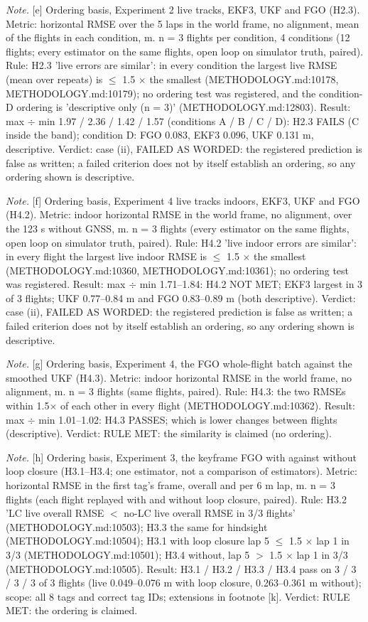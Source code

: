 \begin{table}[htbp]
\textit{Note.} [e] Ordering basis, Experiment 2 live tracks, EKF3, UKF and FGO (H2.3). Metric: horizontal RMSE over the 5 laps in the world frame, no alignment, mean of the flights in each condition, m. n = 3 flights per condition, 4 conditions (12 flights; every estimator on the same flights, open loop on simulator truth, paired). Rule: H2.3 'live errors are similar': in every condition the largest live RMSE (mean over repeats) is $\le$ 1.5 $\times$ the smallest (METHODOLOGY.md:10178, METHODOLOGY.md:10179); no ordering test was registered, and the condition-D ordering is 'descriptive only (n = 3)' (METHODOLOGY.md:12803). Result: max $\div$ min 1.97 / 2.36 / 1.42 / 1.57 (conditions A / B / C / D): H2.3 FAILS (C inside the band); condition D: FGO 0.083, EKF3 0.096, UKF 0.131 m, descriptive. Verdict: case (ii), FAILED AS WORDED: the registered prediction is false as written; a failed criterion does not by itself establish an ordering, so any ordering shown is descriptive.\par
\textit{Note.} [f] Ordering basis, Experiment 4 live tracks indoors, EKF3, UKF and FGO (H4.2). Metric: indoor horizontal RMSE in the world frame, no alignment, over the 123 s without GNSS, m. n = 3 flights (every estimator on the same flights, open loop on simulator truth, paired). Rule: H4.2 'live indoor errors are similar': in every flight the largest live indoor RMSE is $\le$ 1.5 $\times$ the smallest (METHODOLOGY.md:10360, METHODOLOGY.md:10361); no ordering test was registered. Result: max $\div$ min 1.71--1.84: H4.2 NOT MET; EKF3 largest in 3 of 3 flights; UKF 0.77--0.84 m and FGO 0.83--0.89 m (both descriptive). Verdict: case (ii), FAILED AS WORDED: the registered prediction is false as written; a failed criterion does not by itself establish an ordering, so any ordering shown is descriptive.\par
\textit{Note.} [g] Ordering basis, Experiment 4, the FGO whole-flight batch against the smoothed UKF (H4.3). Metric: indoor horizontal RMSE in the world frame, no alignment, m. n = 3 flights (same flights, paired). Rule: H4.3: the two RMSEs within 1.5$\times$ of each other in every flight (METHODOLOGY.md:10362). Result: max $\div$ min 1.01--1.02: H4.3 PASSES; which is lower changes between flights (descriptive). Verdict: RULE MET: the similarity is claimed (no ordering).\par
\textit{Note.} [h] Ordering basis, Experiment 3, the keyframe FGO with against without loop closure (H3.1--H3.4; one estimator, not a comparison of estimators). Metric: horizontal RMSE in the first tag's frame, overall and per 6 m lap, m. n = 3 flights (each flight replayed with and without loop closure, paired). Rule: H3.2 'LC live overall RMSE $<$ no-LC live overall RMSE in 3/3 flights' (METHODOLOGY.md:10503); H3.3 the same for hindsight (METHODOLOGY.md:10504); H3.1 with loop closure lap 5 $\le$ 1.5 $\times$ lap 1 in 3/3 (METHODOLOGY.md:10501); H3.4 without, lap 5 $>$ 1.5 $\times$ lap 1 in 3/3 (METHODOLOGY.md:10505). Result: H3.1 / H3.2 / H3.3 / H3.4 pass on 3 / 3 / 3 / 3 of 3 flights (live 0.049--0.076 m with loop closure, 0.263--0.361 m without); scope: all 8 tags and correct tag IDs; extensions in footnote [k]. Verdict: RULE MET: the ordering is claimed.\par

\end{table}
